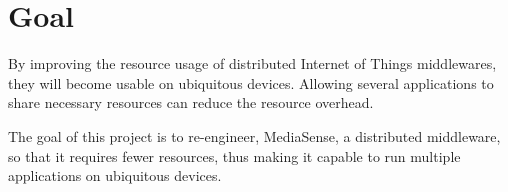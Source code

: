 \section{Goal}
By improving the resource usage of distributed Internet of Things middlewares, they will become usable on ubiquitous devices. Allowing several applications to share necessary resources can reduce the resource overhead. 

The goal of this project is to re-engineer, MediaSense, a distributed middleware, so that it requires fewer resources, thus making it capable to run multiple applications on ubiquitous devices. 
